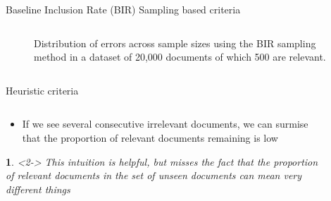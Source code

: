 \documentclass[9pt, aspectratio=169]{beamer}
\newtheorem*{remark}{}
\begin{document}
\begin{frame}{Baseline Inclusion Rate (BIR) Sampling based criteria}
\begin{columns}
\begin{column}{0.618\linewidth}
\begin{figure}
{	\caption{\small Distribution of errors across sample sizes using the BIR sampling method in a dataset of 20,000 documents of which 500 are relevant. }}
		\end{figure}


	\end{column}
\end{columns}
\end{frame}

\begin{frame}{Heuristic criteria}
\begin{columns}
	\begin{column}{0.618\linewidth}
		\begin{itemize}
			\item If we see several consecutive irrelevant documents, we can surmise that the proportion of relevant documents remaining is low
		\end{itemize}
	
		\begin{remark}<2->
			This intuition is helpful, but misses the fact that the proportion of relevant documents in the set of unseen documents can mean very different things
		\end{remark}
	\end{column}
	\begin{column}{0.382\linewidth}
		
		\begin{figure}
		\end{figure}


\end{column}
\end{columns}
\end{frame}
\end{document}
